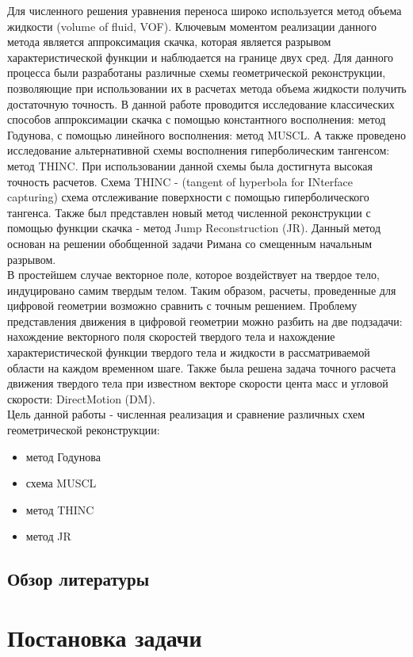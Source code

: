 \documentclass[12pt,a4paper]{article}
\begin{document}
Для численного решения уравнения переноса широко используется метод объема жидкости (volume of fluid, VOF). Ключевым моментом реализации данного метода является аппроксимация скачка, которая является разрывом характеристической функции и наблюдается на границе двух сред. Для данного процесса были разработаны различные схемы геометрической реконструкции, позволяющие при использовании их в расчетах метода объема жидкости получить достаточную точность. В данной работе проводится исследование классических способов аппроксимации скачка с помощью константного восполнения: метод Годунова, с помощью линейного восполнения: метод MUSCL. А также проведено исследование альтернативной схемы восполнения гиперболическим тангенсом: метод THINC. При использовании данной схемы была достигнута высокая точность расчетов. Схема THINC - (tangent of hyperbola for INterface capturing) схема отслеживание поверхности с помощью гиперболического тангенса. Также был представлен новый метод численной реконструкции с помощью функции скачка - метод Jump Reconstruction (JR). Данный метод основан на решении обобщенной задачи Римана со смещенным начальным разрывом.\\
В простейшем случае векторное поле, которое воздействует на твердое тело, индуцировано самим твердым телом. Таким образом, расчеты, проведенные для цифровой геометрии возможно сравнить с точным решением. Проблему представления движения в цифровой геометрии можно разбить на две подзадачи: нахождение векторного поля скоростей твердого тела и нахождение характеристической функции твердого тела и жидкости в рассматриваемой области на каждом временном шаге. Также была решена задача точного расчета движения твердого тела при известном векторе скорости цента масс и угловой скорости: DirectMotion (DM).\\
Цель данной работы - численная реализация и сравнение различных схем геометрической реконструкции:
\begin{itemize}
  \item метод Годунова
  \item схема MUSCL
  \item метод THINC
  \item метод JR
\end{itemize}


\subsection{Обзор литературы}


\section{Постановка задачи}
\end{document}
